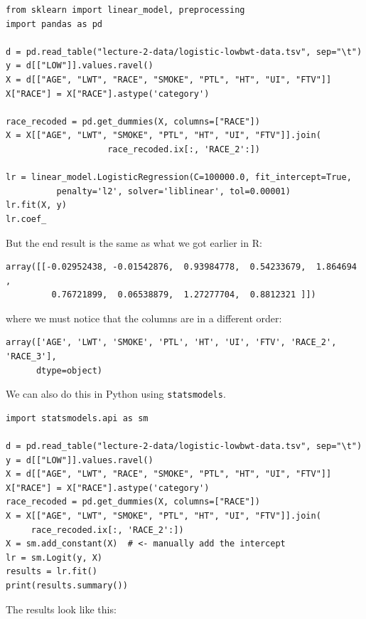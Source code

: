 {\small
\begin{verbatim}
from sklearn import linear_model, preprocessing
import pandas as pd

d = pd.read_table("lecture-2-data/logistic-lowbwt-data.tsv", sep="\t")
y = d[["LOW"]].values.ravel()
X = d[["AGE", "LWT", "RACE", "SMOKE", "PTL", "HT", "UI", "FTV"]]
X["RACE"] = X["RACE"].astype('category')

race_recoded = pd.get_dummies(X, columns=["RACE"])
X = X[["AGE", "LWT", "SMOKE", "PTL", "HT", "UI", "FTV"]].join(
                    race_recoded.ix[:, 'RACE_2':])
  
lr = linear_model.LogisticRegression(C=100000.0, fit_intercept=True,
          penalty='l2', solver='liblinear', tol=0.00001)
lr.fit(X, y)
lr.coef_
\end{verbatim}
}

\noindent But the end result is the same as what we got earlier in R:

{\small
\begin{verbatim}
array([[-0.02952438, -0.01542876,  0.93984778,  0.54233679,  1.864694  ,
         0.76721899,  0.06538879,  1.27277704,  0.8812321 ]])
\end{verbatim}
}

\noindent where we must notice that the columns are in a different order:

{\small
\begin{verbatim}
array(['AGE', 'LWT', 'SMOKE', 'PTL', 'HT', 'UI', 'FTV', 'RACE_2', 'RACE_3'], 
      dtype=object)
\end{verbatim}
}

\noindent We can also do this in Python using \texttt{statsmodels}. 

{\small
\begin{verbatim}
import statsmodels.api as sm

d = pd.read_table("lecture-2-data/logistic-lowbwt-data.tsv", sep="\t")
y = d[["LOW"]].values.ravel()
X = d[["AGE", "LWT", "RACE", "SMOKE", "PTL", "HT", "UI", "FTV"]]
X["RACE"] = X["RACE"].astype('category')
race_recoded = pd.get_dummies(X, columns=["RACE"])
X = X[["AGE", "LWT", "SMOKE", "PTL", "HT", "UI", "FTV"]].join(
     race_recoded.ix[:, 'RACE_2':])
X = sm.add_constant(X)  # <- manually add the intercept
lr = sm.Logit(y, X)
results = lr.fit()
print(results.summary())
\end{verbatim}
}

\noindent The results look like this:

